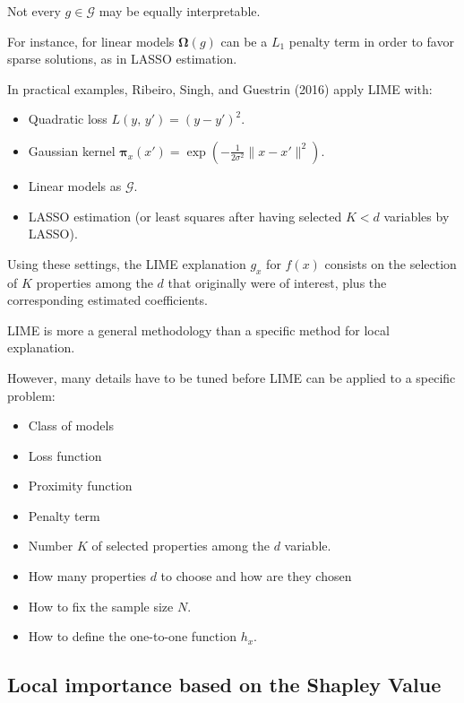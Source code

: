 \begin{note}
	Not every $g\in\mathcal G$ may be equally interpretable.

	For instance, for linear models $\boldsymbol\Omega(g)$ can be
	a $L_1$ penalty term in order to favor sparse solutions, as in LASSO estimation.
\end{note}

\begin{example}{}{}
	In practical examples, Ribeiro, Singh, and Guestrin (2016) apply LIME
	with:
	\begin{itemize}
		\item Quadratic loss $L(y,\,y') = (y - y')^2$.
		\item Gaussian kernel $\boldsymbol \pi_x(x') = \exp \left( -\frac{1}{2\sigma^2} \|x - x'\|^2 \right)$.
		\item Linear models as $\mathcal G$.
		\item LASSO estimation (or least squares after having selected $K < d$ variables
		      by LASSO).
	\end{itemize}

	Using these settings, the LIME explanation $g_x$ for $f(x)$ consists on
	the selection of $K$ properties among the $d$ that originally were of
	interest, plus the corresponding estimated coefficients.
\end{example}

\begin{note}
	LIME is more a general methodology than a specific method for local
	explanation.
\end{note}

However, many details have to be tuned before LIME can be applied to a
specific problem:
\begin{itemize}
	\item Class of models
	\item Loss function
	\item Proximity function
	\item Penalty term
	\item Number $K$ of selected properties among the $d$ variable.
	\item How many properties $d$ to choose and how are they chosen
	\item How to fix the sample size $N$.
	\item How to define the one-to-one function $h_x$.
\end{itemize}

\subsection{Local importance based on the Shapley Value}

